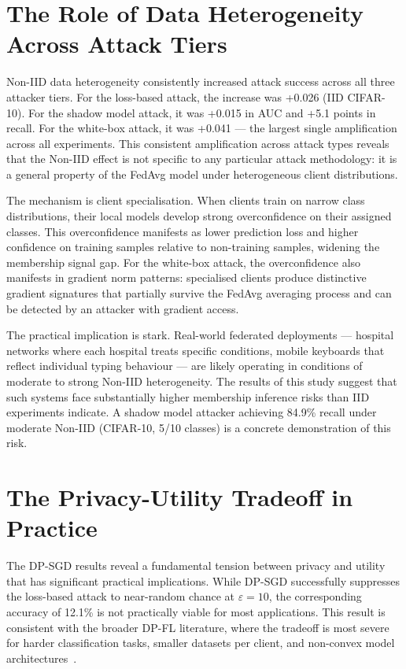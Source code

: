 \documentclass[12pt, a4paper]{report}
\begin{document}
\section{The Role of Data Heterogeneity Across Attack Tiers}

Non-IID data heterogeneity consistently increased attack success across all three
attacker tiers. For the loss-based attack, the increase was +0.026 (IID CIFAR-10).
For the shadow model attack, it was +0.015 in AUC and +5.1 points in recall. For
the white-box attack, it was +0.041 --- the largest single amplification across
all experiments. This consistent amplification across attack types reveals that
the Non-IID effect is not specific to any particular attack methodology: it is
a general property of the FedAvg model under heterogeneous client distributions.

The mechanism is client specialisation. When clients train on narrow class
distributions, their local models develop strong overconfidence on their assigned
classes. This overconfidence manifests as lower prediction loss and higher
confidence on training samples relative to non-training samples, widening the
membership signal gap. For the white-box attack, the overconfidence also manifests
in gradient norm patterns: specialised clients produce distinctive gradient
signatures that partially survive the FedAvg averaging process and can be detected
by an attacker with gradient access.

The practical implication is stark. Real-world federated deployments --- hospital
networks where each hospital treats specific conditions, mobile keyboards that
reflect individual typing behaviour --- are likely operating in conditions of
moderate to strong Non-IID heterogeneity. The results of this study suggest that
such systems face substantially higher membership inference risks than IID
experiments indicate. A shadow model attacker achieving 84.9\% recall under moderate
Non-IID (CIFAR-10, 5/10 classes) is a concrete demonstration of this risk.

\section{The Privacy-Utility Tradeoff in Practice}

The DP-SGD results reveal a fundamental tension between privacy and utility that
has significant practical implications. While DP-SGD successfully suppresses the
loss-based attack to near-random chance at $\varepsilon = 10$, the corresponding
accuracy of 12.1\% is not practically viable for most applications. This result
is consistent with the broader DP-FL literature, where the tradeoff is most severe
for harder classification tasks, smaller datasets per client, and non-convex
model architectures~\cite{yin2024dpfl, hu2024dp}.
\end{document}
